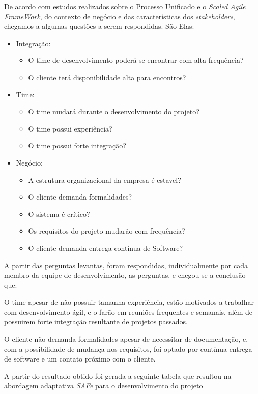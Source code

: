 	De acordo com estudos realizados sobre o Processo Unificado e o \textit{Scaled Agile FrameWork}, do contexto de negócio e das características dos \textit{stakeholders}, chegamos a algumas questões a serem respondidas. São Elas:
	\begin{itemize}
		\item Integração:
			\begin{itemize}
			\item O time de desenvolvimento poderá se encontrar com alta frequência?
			\item O cliente terá disponibilidade alta para encontros?
		\end{itemize}
		\item Time:
		\begin{itemize}
			\item O time mudará durante o desenvolvimento do projeto?
			\item O time possui experiência?
			\item O time possui forte integração?
		\end{itemize}

		\item Negócio:
		\begin{itemize}
			\item A estrutura organizacional da empresa é estavel?
			\item O cliente demanda formalidades?
			\item O sistema é crítico?
			\item Os requisitos do projeto mudarão com frequência?
			\item O cliente demanda entrega contínua de Software?
		\end{itemize}
	\end{itemize}
	\par
	A partir das perguntas levantas, foram respondidas, individualmente por cada membro da equipe de desenvolvimento, as perguntas, e chegou-se a conclusão que: \par O time apesar de não possuir tamanha experiência, estão motivados a trabalhar com desenvolvimento ágil, e o farão em reuniões frequentes e semanais, alêm de possuirem forte integração resultante de projetos passados. \par
	O cliente não demanda formalidades apesar de necessitar de documentação, e, com a possibilidade de mudança nos requisitos, foi optado por contínua entrega de software e um contato próximo com o cliente.
	\par A partir do resultado obtido foi gerada a seguinte tabela que resultou na abordagem adaptativa \textit{SAFe} para o desenvolvimento do projeto



